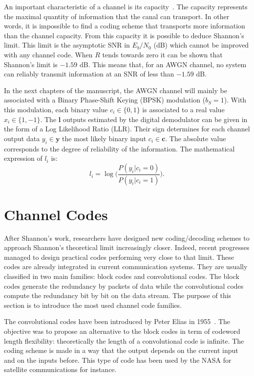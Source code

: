 An important characteristic of a channel is its capacity~\cite{Shannon1948}. The
capacity represents the maximal quantity of information that the canal can
transport. In other words, it is impossible to find a coding scheme that
transports more information than the channel capacity. From this capacity it is
possible to deduce Shannon's limit. This limit is the asymptotic SNR in
$E_b/N_0$ (dB) which cannot be improved with any channel code. When $R$ tends
towards zero it can be shown that Shannon's limit is $-1.59$ dB. This means
that, for an AWGN channel, no system can reliably transmit information at an SNR
of less than $-1.59$ dB.

In the next chapters of the manuscript, the AWGN channel will mainly be
associated with a Binary Phase-Shift Keying (BPSK) modulation ($b_S = 1$). With
this modulation, each binary value $c_i \in \{0,1\}$ is associated to a real
value $x_i \in \{1,-1\}.$ The $\bm{l}$ outputs estimated by the digital
demodulator can be given in the form of a Log Likelihood Ratio (LLR). Their sign
determines for each channel output data $y_i \in \bm{y}$ the most likely binary
input $c_i \in \bm{c}$. The absolute value corresponds to the degree of
reliability of the information. The mathematical expression of $l_i$ is:
\begin{equation*}
l_i = \log{\Big(\frac{P(y_i|c_i = 0)}{P(y_i|c_i = 1)}\Big)}.
\end{equation*}

\section{Channel Codes}

After Shannon's work, researchers have designed new coding/decoding schemes to
approach Shannon's theoretical limit increasingly closer. Indeed, recent
progresses managed to design practical codes performing very close to that
limit. These codes are already integrated in current communication systems. They
are usually classified in two main families: block codes and convolutional
codes. The block codes generate the redundancy by packets of data while the
convolutional codes compute the redundancy bit by bit on the data stream. The
purpose of this section is to introduce the most used channel code families.

The convolutional codes have been introduced by Peter Elias in
1955~\cite{Elias1955}. The objective was to propose an alternative to the block
codes in term of codeword length flexibility: theoretically the length of a
convolutional code is infinite. The coding scheme is made in a way that the
output depends on the current input and on the inputs before. This type of code
has been used by the NASA for satellite communications for instance.


